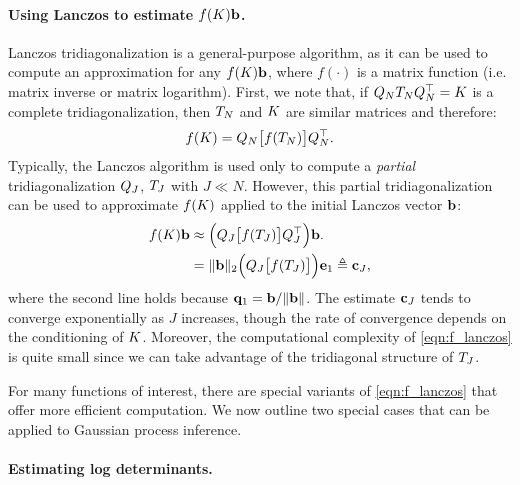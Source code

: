 \paragraph{Using Lanczos to estimate $f (K) \mathbf{b}$.}
Lanczos tridiagonalization is a general-purpose algorithm, as it can be used to compute an approximation for any $f(K) \mathbf{b}$, where $f( \cdot )$ is a matrix function (i.e. matrix inverse or matrix logarithm).
First, we note that, if $Q_N T_N Q_N^\top = K$ is a complete tridiagonalization, then $T_N$ and $K$ are similar matrices and therefore:
\begin{equation}
  f ( K ) = Q_N \bigl[ f ( T_N ) \bigr] Q_N^\top.
  \label{eqn:f_tridiagonal}
\end{equation}
%
%
Typically, the Lanczos algorithm is used only to compute a \emph{partial} tridiagonalization $Q_J$, $T_J$ with $J \ll N$.
However, this partial tridiagonalization can be used to approximate $f ( K )$ applied to the initial Lanczos vector $\mathbf{b}$:
%
\begin{align}
  f ( K ) \mathbf{b}
  &\approx \Bigl( Q_J \bigl[ f ( T_J ) \bigr] Q_J^\top \Bigr) \mathbf{b}.
  \nonumber \\
  &= \Vert \mathbf{b} \Vert_2 \Bigl( Q_J \bigl[ f ( T_J ) \bigr] \Bigr) \mathbf{e}_{1}
  \triangleq \mathbf{c}_J,
  \label{eqn:f_lanczos}
\end{align}
%
where the second line holds because $\mathbf{q}_1 = \mathbf{b} / \Vert \mathbf{b} \Vert$.
The estimate $\mathbf{c}_J$ tends to converge exponentially as $J$ increases, though the rate of convergence depends on the conditioning of $K$.
Moreover, the computational complexity of \cref{eqn:f_lanczos} is quite small since we can take advantage of the tridiagonal structure of $T_J$.

For many functions of interest, there are special variants of \cref{eqn:f_lanczos} that offer more efficient computation.
We now outline two special cases that can be applied to Gaussian process inference.

\paragraph{Estimating log determinants.}

